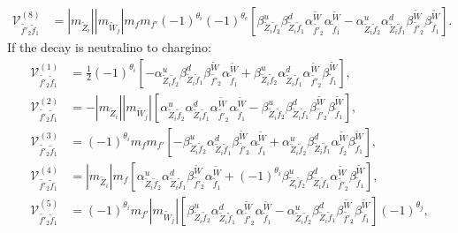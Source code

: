 \documentclass[final,3p,times,pdflatex]{elsarticle}
\begin{document}
\begin{align}
\mathcal{V}_{\tilde{f'}_2 \tilde{f}_1}^{(8)} &= |m_{\tilde{Z}_i}||m_{\tilde{W}_j}|m_{f} m_{f'} (-1)^{\theta_i} (-1)^{\theta_c} \left[\beta_{\tilde{Z}_i \tilde{f}_2}^{u}\beta_{\tilde{Z}_i \tilde{f}_1}^{d} \alpha_{\tilde{f'}_2}^{\tilde{W}} \alpha_{\tilde{f}_1}^{\tilde{W}} - \alpha_{\tilde{Z}_i \tilde{f}_2}^{u} \alpha_{\tilde{Z}_i \tilde{f}_1}^{d} \beta_{\tilde{f'}_2}^{\tilde{W}} \beta_{\tilde{f}_1}^{\tilde{W}}\right].
\end{align}
If the decay is neutralino to chargino:
\begin{align}
\mathcal{V}_{\tilde{f'}_2 \tilde{f}_1}^{(1)} &= \frac{1}{2}(-1)^{\theta_i}\left[-\alpha_{\tilde{Z}_i \tilde{f}_2}^{u} \beta_{\tilde{Z}_i \tilde{f}_1}^{d} \beta_{\tilde{f'}_2}^{\tilde{W}}\alpha_{\tilde{f}_1}^{\tilde{W}} + \beta_{\tilde{Z}_i \tilde{f}_2}^{u} \alpha_{\tilde{Z}_i \tilde{f}_1}^{d} \alpha_{\tilde{f'}_2}^{\tilde{W}} \beta_{\tilde{f}_1}^{\tilde{W}}\right], \\
\mathcal{V}_{\tilde{f'}_2 \tilde{f}_1}^{(2)} &= -|m_{\tilde{Z}_i}||m_{\tilde{W}_j}|\left[\alpha_{\tilde{Z}_i \tilde{f}_2}^{u} \alpha_{\tilde{Z}_i \tilde{f}_1}^{d} \alpha_{\tilde{f'}_2}^{\tilde{W}} \alpha_{\tilde{f}_1}^{\tilde{W}} - \beta_{\tilde{Z}_i \tilde{f}_2}^{u} \beta_{\tilde{Z}_{i} \tilde{f}_1}^{d} \beta_{\tilde{f'}_2}^{\tilde{W}} \beta_{\tilde{f}_1}^{\tilde{W}}\right], \\
\mathcal{V}_{\tilde{f'}_2 \tilde{f}_1}^{(3)} &= (-1)^{\theta_i} m_{f}m_{f'}\left[-\beta_{\tilde{Z}_i \tilde{f}_2}^{u} \alpha_{\tilde{Z}_i \tilde{f}_1}^{d} \beta_{\tilde{f'}_2}^{\tilde{W}} \alpha_{\tilde{f}_1}^{\tilde{W}} +  \alpha_{\tilde{Z}_i \tilde{f}_2}^{u} \beta_{\tilde{Z}_i \tilde{f}_1}^{d} \alpha_{\tilde{f}_2}^{\tilde{W}} \beta_{\tilde{f}_1}^{\tilde{W}}\right], \\
\mathcal{V}_{\tilde{f'}_2 \tilde{f}_1}^{(4)} &= |m_{\tilde{Z}_i}|m_{f}\left[\alpha_{\tilde{Z}_i \tilde{f}_2}^{u} \alpha_{\tilde{Z}_i \tilde{f}_1}^{d} \beta_{\tilde{f'}_2}^{\tilde{W}}\alpha_{\tilde{f}_1}^{\tilde{W}} + (-1)^{\theta_i} \beta_{\tilde{Z}_i \tilde{f}_2}^{u} \beta_{\tilde{Z}_i \tilde{f}_1}^{d} \alpha_{\tilde{f'}_2}^{\tilde{W}} \beta_{\tilde{f}_1}^{\tilde{W}}\right], \\
\mathcal{V}_{\tilde{f'}_2 \tilde{f}_1}^{(5)} &= (-1)^{\theta_i} m_{f'} |m_{\tilde{W}_j}|\left[ \beta_{\tilde{Z}_i \tilde{f}_2}^{u} \alpha_{\tilde{Z}_i \tilde{f}_1}^{d} \alpha_{\tilde{f'}_2}^{\tilde{W}} \alpha_{\tilde{f}_1}^{\tilde{W}} - \alpha_{\tilde{Z}_i \tilde{f}_2}^{u} \beta_{\tilde{Z}_i \tilde{f}_1}^{d} \beta_{\tilde{f'}_2}^{\tilde{W}} \beta_{\tilde{f}_1}^{\tilde{W}}\right](-1)^{\theta_j}, \\

\end{align}
\end{document}
